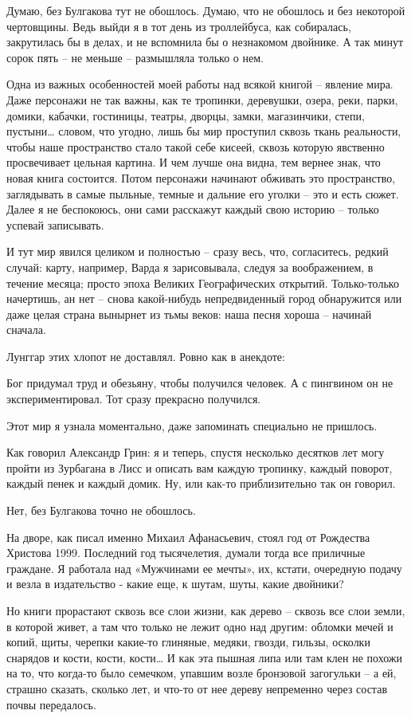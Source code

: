 Думаю, без Булгакова тут не обошлось. Думаю, что не обошлось и без некоторой
чертовщины. Ведь выйди я в тот день из троллейбуса, как собиралась, закрутилась
бы в делах, и не вспомнила бы о незнакомом двойнике. А так минут сорок пять –
не меньше – размышляла только о нем.

Одна из важных особенностей моей работы над всякой книгой – явление мира. Даже
персонажи не так важны, как те тропинки, деревушки, озера, реки, парки, домики,
кабачки, гостиницы, театры, дворцы, замки, магазинчики, степи, пустыни… словом,
что угодно, лишь бы мир проступил сквозь ткань реальности, чтобы наше
пространство стало такой себе кисеей, сквозь которую явственно просвечивает
цельная картина. И чем лучше она видна, тем вернее знак, что новая книга
состоится. Потом персонажи начинают обживать это пространство, заглядывать в
самые пыльные, темные и дальние его уголки – это и есть сюжет. Далее я не
беспокоюсь, они сами расскажут каждый свою историю – только успевай записывать.

И тут мир явился целиком и полностью – сразу весь, что, согласитесь, редкий
случай: карту, например, Варда я зарисовывала, следуя за воображением, в
течение месяца; просто эпоха Великих Географических открытий. Только-только
начертишь, ан нет – снова какой-нибудь непредвиденный город обнаружится или
даже целая страна вынырнет из тьмы веков: наша песня хороша – начинай сначала.

Лунггар этих хлопот не доставлял. Ровно как в анекдоте:

Бог придумал труд и обезьяну, чтобы получился человек. А с пингвином он не
экспериментировал. Тот сразу прекрасно получился.

Этот мир я узнала моментально, даже запоминать специально не пришлось.

Как говорил Александр Грин: я и теперь, спустя несколько десятков лет могу
пройти из Зурбагана в Лисс и описать вам каждую тропинку, каждый поворот,
каждый пенек и каждый домик. Ну, или как-то приблизительно так он говорил.

Нет, без Булгакова точно не обошлось.

На дворе, как писал именно Михаил Афанасьевич, стоял год от Рождества Христова
1999. Последний год тысячелетия, думали тогда все приличные граждане. Я
работала над «Мужчинами ее мечты», их, кстати, очередную подачу и везла в
издательство - какие еще, к шутам, шуты, какие двойники?

Но книги прорастают сквозь все слои жизни, как дерево – сквозь все слои земли,
в которой живет, а там что только не лежит одно над другим: обломки мечей и
копий, щиты, черепки какие-то глиняные, медяки, гвозди, гильзы, осколки
снарядов и кости, кости, кости… И как эта пышная липа или там клен не похожи на
то, что когда-то было семечком, упавшим возле бронзовой загогульки – а ей,
страшно сказать, сколько лет, и что-то от нее дереву непременно через состав
почвы передалось.


